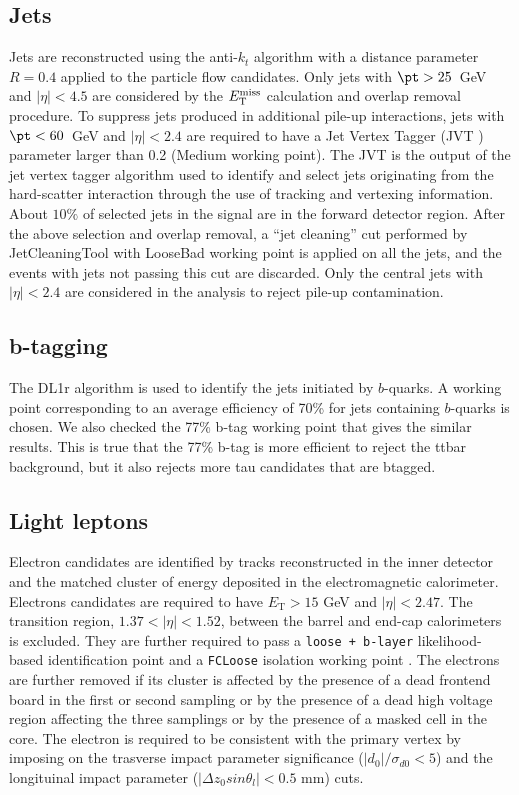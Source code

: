 \subsection{Jets}
Jets are reconstructed using the anti-$k_t$ algorithm \cite{antikt} with a distance parameter $R=0.4$ applied to the particle flow candidates. Only jets with $\pt>25$~GeV and $|\eta|<4.5$ are considered by the $E_{\text{T}}^{\text{miss}}$ calculation and overlap removal procedure. To suppress jets produced in additional pile-up interactions, jets with $\pt<60$~GeV and $|\eta|<2.4$ are required to have a Jet Vertex Tagger (JVT \cite{JVT}) parameter larger than 0.2 (Medium working point). The JVT is the output of the jet vertex tagger algorithm used to identify and select jets originating from the hard-scatter interaction through the use of tracking and vertexing information. About $10\%$ of selected jets in the signal are in the forward detector region. After the above selection and overlap removal, a ``jet cleaning'' cut performed by JetCleaningTool with LooseBad working point is applied on all the jets, and the events with jets not passing this cut are discarded. Only the central jets with $|\eta|<2.4$ are considered in the analysis to reject pile-up contamination.

\subsection{b-tagging}
The {\texttt\scriptsize DL1r} \cite{btag1} algorithm is used to identify the jets initiated by $b$-quarks. A working point corresponding to an average efficiency of 70\% for jets containing $b$-quarks is chosen. We also checked the 77\% b-tag working point that gives the similar results.
This is true that the 77\% b-tag is more efficient to reject the ttbar background, but it also rejects more tau candidates that are btagged.

\subsection{Light leptons}
Electron candidates are identified by tracks reconstructed in the inner detector and the matched cluster of energy deposited in the electromagnetic calorimeter. Electrons candidates are required to have $E_{\text{T}} > 15$ GeV and $|\eta|<2.47$. The transition region, $1.37<|\eta|<1.52$, between the barrel and end-cap calorimeters is excluded. They are further required to pass a \texttt{loose + b-layer} likelihood-based identification point \cite{ElectronID} and a \texttt{FCLoose} isolation working point \cite{IsolationWP}. The electrons are further removed  if its cluster is affected by the presence of a dead frontend board in the first or second sampling or by the presence of a dead high voltage region affecting the three samplings or by the presence of a masked cell in the core. The electron is required to be consistent with the primary vertex by imposing on the trasverse impact parameter significance ($|d_0|/\sigma_{d0}<5$) and 
the longituinal impact parameter ($|\Delta z_0 sin\theta_l|<0.5$ mm) cuts. 

